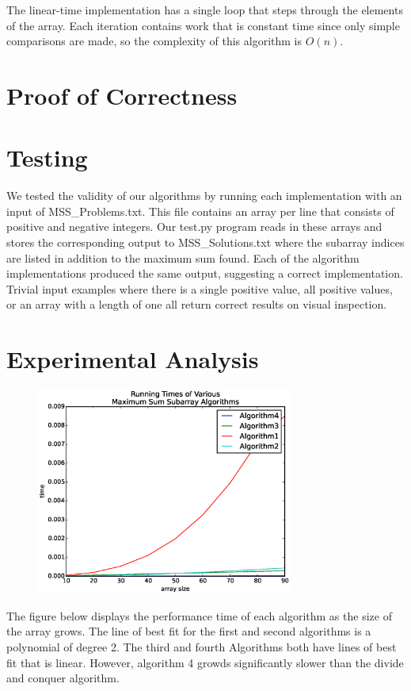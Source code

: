 \documentclass[letWterpaper,10pt,titlepage]{article}
\begin{document}
The linear-time implementation has a single loop that steps through the elements of the array. Each iteration contains work that is constant time since only simple comparisons are made, so the complexity of this algorithm is $O(n)$.

\section{Proof of Correctness}

\section{Testing}
We tested the validity of our algorithms by running each implementation with an input of MSS\_Problems.txt. This file contains an array per line that consists of positive and negative integers. Our test.py program reads in these arrays and stores the corresponding output to MSS\_Solutions.txt where the subarray indices are listed in addition to the maximum sum found. Each of the algorithm implementations produced the same output, suggesting a correct implementation. Trivial input examples where there is a single positive value, all positive values, or an array with a length of one all return correct results on visual inspection.

\section{Experimental Analysis}

\begin{figure}
    \centering
    \includegraphics[width=0.75\textwidth]{../bin/testrun.eps}
\end{figure}

The figure below displays the performance time of each algorithm as the size of the array grows. The line of best fit for the first and second algorithms is a polynomial of degree 2. The third and fourth Algorithms both have lines of best fit that is linear. However, algorithm 4 growds significantly slower than the divide and conquer algorithm.
\end{document}
